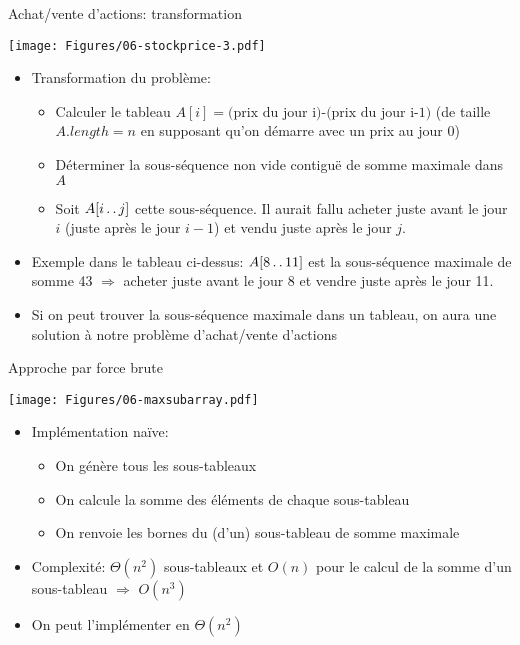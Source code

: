 \begin{frame}{Achat/vente d'actions: transformation}

\centerline{\texttt{[image: Figures/06-stockprice-3.pdf]}}

\bigskip

\begin{itemize}
\item Transformation du problème:
\begin{itemize}
\item Calculer le tableau $A[i]=\mbox{(prix du jour i)-(prix du jour i-1)}$ (de taille $A.length=n$ en supposant qu'on démarre avec un prix au jour 0)
\item Déterminer la sous-séquence  non vide contiguë de somme maximale dans $A$
\item Soit $A[i\mathinner{\ldotp\ldotp} j]$ cette sous-séquence. Il aurait fallu acheter juste avant le jour $i$ (juste après le jour $i-1$) et vendu juste après le jour $j$.
\end{itemize}
\item Exemple dans le tableau ci-dessus: $A[8\mathinner{\ldotp\ldotp} 11]$ est la sous-séquence maximale de somme 43 $\Rightarrow$ acheter juste avant le jour 8 et vendre juste après le jour 11.
\item Si on peut trouver la sous-séquence maximale dans un tableau, on aura une solution à notre problème d'achat/vente d'actions
\end{itemize}
\end{frame}

\begin{frame}{Approche par force brute}
\centerline{\texttt{[image: Figures/06-maxsubarray.pdf]}}

\bigskip

\begin{itemize}
\item Implémentation naïve:
\begin{itemize}
\item On génère tous les sous-tableaux 
\item On calcule la somme des éléments de chaque sous-tableau
\item On renvoie les bornes du (d'un) sous-tableau de somme maximale
\end{itemize}
\item Complexité: $\Theta(n^2)$ sous-tableaux et $O(n)$ pour le calcul
  de la somme d'un sous-tableau $\Rightarrow$ $O(n^3)$
\item On peut l'implémenter en $\Theta(n^2)$
\end{itemize}

\end{frame}

